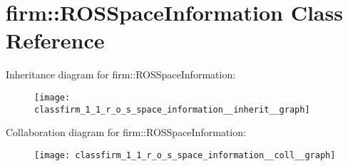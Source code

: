 \hypertarget{classfirm_1_1_r_o_s_space_information}{\section{firm\-:\-:R\-O\-S\-Space\-Information Class Reference}
\label{classfirm_1_1_r_o_s_space_information}
}


Inheritance diagram for firm\-:\-:R\-O\-S\-Space\-Information\-:\nopagebreak
\begin{figure}[H]
\begin{center}
\leavevmode
\texttt{[image: classfirm\_1\_1\_r\_o\_s\_space\_information\_\_inherit\_\_graph]}
\end{center}
\end{figure}


Collaboration diagram for firm\-:\-:R\-O\-S\-Space\-Information\-:\nopagebreak
\begin{figure}[H]
\begin{center}
\leavevmode
\texttt{[image: classfirm\_1\_1\_r\_o\_s\_space\_information\_\_coll\_\_graph]}
\end{center}
\end{figure}
